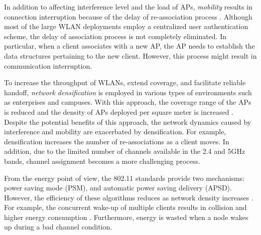 In addition to affecting interference level and the load of APs, \textit{mobility} results in connection interruption because of the delay of re-association process \cite{Odin,CloudMAC3}.
Although most of the large WLAN deployments employ a centralized user authentication scheme, the delay of association process is not completely eliminated.
In particular, when a client associates with a new AP, the AP needs to establish the data structures pertaining to the new client.
However, this process might result in communication interruption.


To increase the throughput of WLANs, extend coverage, and facilitate reliable handoff, \textit{network densification} is employed in various types of environments such as enterprises and campuses.
With this approach, the coverage range of the APs is reduced and the density of APs deployed per square meter is increased \cite{APdensity}.
Despite the potential benefits of this approach, the network dynamics caused by interference and mobility are exacerbated by densification.
For example, densification increases the number of re-associations as a client moves.
In addition, due to the limited number of channels available in the 2.4 and 5GHz bands, channel assignment becomes a more challenging process.





From the energy point of view, the 802.11 standards provide two mechanisms: power saving mode (PSM), and automatic power saving delivery (APSD).
However, the efficiency of these algorithms reduces as network density increases \cite{ting2010power,zeng2011sofa}.
For example, the concurrent wake-up of multiple clients results in collision and higher energy consumption \cite{liu2014energy}.
Furthermore, energy is wasted when a node wakes up during a bad channel condition.







